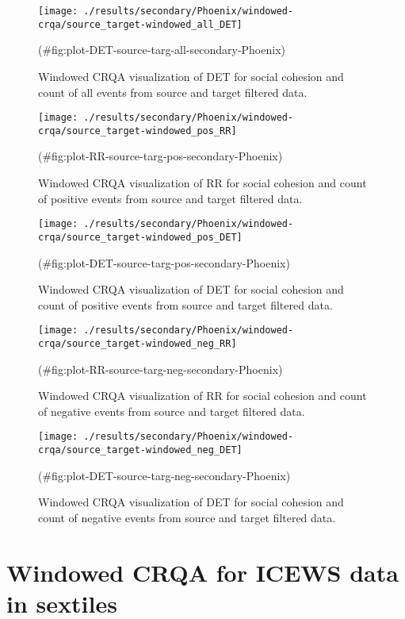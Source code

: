 \begin{appendix}
\begin{figure}[H]
\end{figure}
\begin{figure}[H]
\texttt{[image: ./results/secondary/Phoenix/windowed-crqa/source\_target-windowed\_all\_DET]} \caption{Windowed CRQA visualization of DET for social cohesion and count of all events from source and target filtered data.}(\#fig:plot-DET-source-targ-all-secondary-Phoenix)
\end{figure}
\begin{figure}[H]
\texttt{[image: ./results/secondary/Phoenix/windowed-crqa/source\_target-windowed\_pos\_RR]} \caption{Windowed CRQA visualization of RR for social cohesion and count of positive events from source and target filtered data.}(\#fig:plot-RR-source-targ-pos-secondary-Phoenix)
\end{figure}
\begin{figure}[H]
\texttt{[image: ./results/secondary/Phoenix/windowed-crqa/source\_target-windowed\_pos\_DET]} \caption{Windowed CRQA visualization of DET for social cohesion and count of positive events from source and target filtered data.}(\#fig:plot-DET-source-targ-pos-secondary-Phoenix)
\end{figure}
\begin{figure}[H]
\texttt{[image: ./results/secondary/Phoenix/windowed-crqa/source\_target-windowed\_neg\_RR]} \caption{Windowed CRQA visualization of RR for social cohesion and count of negative events from source and target filtered data.}(\#fig:plot-RR-source-targ-neg-secondary-Phoenix)
\end{figure}
\begin{figure}[H]
\texttt{[image: ./results/secondary/Phoenix/windowed-crqa/source\_target-windowed\_neg\_DET]} \caption{Windowed CRQA visualization of DET for social cohesion and count of negative events from source and target filtered data.}(\#fig:plot-DET-source-targ-neg-secondary-Phoenix)
\end{figure}

\hypertarget{windowed-crqa-for-icews-data-in-sextiles}{%
\section{Windowed CRQA for ICEWS data in
sextiles}\label{windowed-crqa-for-icews-data-in-sextiles}}


\end{appendix}
